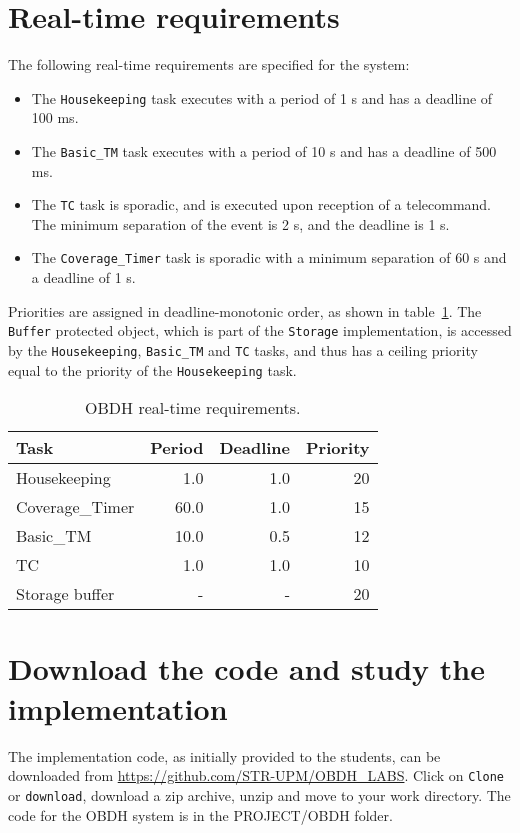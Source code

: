\section{Real-time requirements}

The following real-time requirements are specified for the system:
\begin{itemize}
\item The {\tt Housekeeping} task executes with a period of 1 s and has a deadline of 100 ms.
\item The {\tt Basic\_TM} task executes with a period of 10 s and has a deadline of 500 ms.
\item The {\tt TC} task is sporadic, and is executed upon reception of a telecommand. The minimum separation of the event is 2 s, and the deadline is 1 s.
\item The {\tt Coverage\_Timer} task is sporadic with a minimum separation of 60 s and a deadline of 1 s.
\end{itemize}
Priorities are assigned in deadline-monotonic order, as shown in table~\ref{tb:obdh-requirements}. The {\tt Buffer} protected object, which is part of the {\tt Storage} implementation, is accessed by the {\tt Housekeeping}, {\tt Basic\_TM} and {\tt TC} tasks, and thus has a ceiling priority equal to the priority of the {\tt Housekeeping} task.

\begin{table}[htb]
\begin{center}
\begin{tabular}{|l|r|r|r|} \hline
Task & Period & Deadline & Priority\\ \hline
Housekeeping & 1.0 & 1.0 & 20 \\
Coverage\_Timer & 60.0 & 1.0 & 15 \\
Basic\_TM & 10.0 & 0.5 & 12 \\
TC & 1.0 & 1.0 & 10 \\
Storage buffer & - & - & 20 \\ \hline
\end{tabular}
\caption{OBDH real-time requirements.}
\label{tb:obdh-requirements}
\end{center}
\end{table}

\section{Download the code and study the implementation}


The implementation code, as initially provided to the students, can be downloaded from \url{https://github.com/STR-UPM/OBDH\_LABS}. Click on {\tt Clone} or {\tt download}, download a zip archive, unzip and move to your work directory. The code for the OBDH system is in the PROJECT/OBDH folder.


